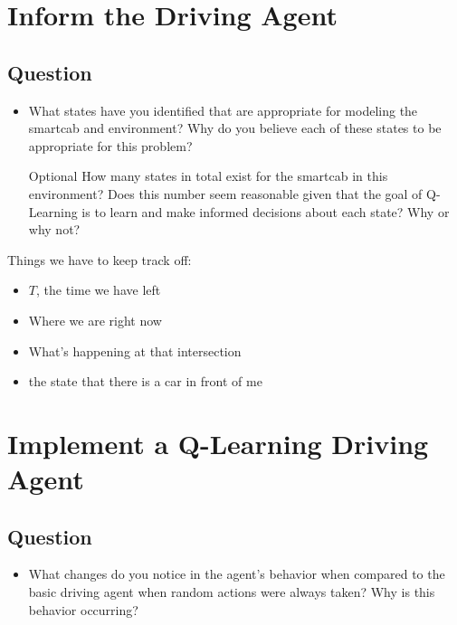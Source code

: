\documentclass[twoside,openright,titlepage,numbers=noenddot,headinclude,%
               footinclude=true,cleardoublepage=empty,abstractoff,BCOR=5mm,%
               paper=a4,fontsize=11pt,ngerman,american]{scrreprt}
\numberwithin{theorem}{chapter}
\numberwithin{definition}{chapter}
\numberwithin{algorithm}{chapter}
\numberwithin{figure}{chapter}
\numberwithin{table}{chapter}
\numberwithin{equation}{chapter}
\begin{document}
\chapter*{Inform the Driving Agent}

\section*{Question}

\begin{itemize}
\item What states have you identified that are appropriate for modeling the smartcab and environment? Why do you believe each of these states to be appropriate for this problem?

\item [Optional] How many states in total exist for the smartcab in this environment? Does this number seem reasonable given that the goal of Q-Learning is to learn and make informed decisions about each state? Why or why not?
\end{itemize}




Things we have to keep track off:
\begin{itemize}
\item $T$, the time we have left
\item Where we are right now
\item What's happening at that intersection
\item the state that there is a car in front of me
\end{itemize}


%
%

\chapter*{Implement a Q-Learning Driving Agent}

\section*{Question}

\begin{itemize}
\item What changes do you notice in the agent's behavior when compared to the basic driving agent when random actions were always taken? Why is this behavior occurring?

\end{itemize}
\end{document}

